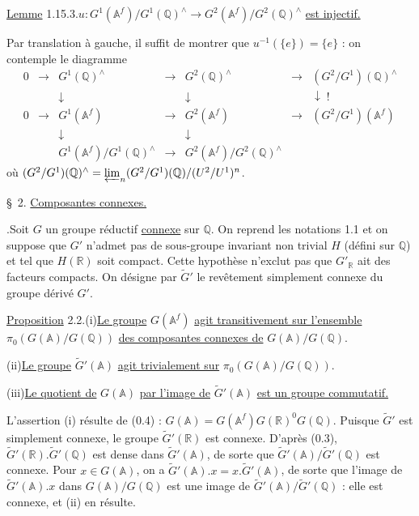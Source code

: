 \documentclass[10pt]{article}
\newcommand{\A}{\mathbb A}
\newcommand{\Af}{\mathbb A^f}
\newcommand{\Q}{\mathbb Q}
\newcommand{\R}{\mathbb R}
\newcommand{\limproj}{\varprojlim}
\begin{document}
\noindent\uline{Lemme} 1.15.3.\quad $u:G^1(\Af)/G^1(\Q)^\wedge\longrightarrow G^2(\Af)/G^2(\Q)^\wedge$ \uline{est injectif.}

Par translation à gauche, il suffit de montrer que $u^{-1}(\{e\})=\{e\}$ : on contemple le diagramme
\[
\begin{array}{ccccccccc}
0&\longrightarrow&G^1(\Q)^\wedge&\longrightarrow&G^2(\Q)^\wedge&\longrightarrow&(G^2/G^1)(\Q)^\wedge\\
&&\downarrow&&\downarrow&&\downarrow\;{\scriptstyle !}\\
0&\longrightarrow&G^1(\Af)&\longrightarrow&G^2(\Af)&\longrightarrow&(G^2/G^1)(\Af)\\
&&\downarrow&&\downarrow&&\\
&&G^1(\Af)/G^1(\Q)^\wedge&\longrightarrow&G^2(\Af)/G^2(\Q)^\wedge&&
\end{array}
\]
où $(G^2/G^1)(\Q)^\wedge=\limproj_n (G^2/G^1)(\Q)/(U^2/U^1)^n$.

\noindent \S\ 2. \uline{Composantes connexes.}\par\vspace{0.9em}

.\quad Soit $G$ un groupe réductif \uline{connexe} sur $\Q$. On reprend les notations 1.1 et on suppose que $G'$ n'admet pas de sous-groupe invariant non trivial $H$ (défini sur $\Q$) et tel que $H(\R)$ soit compact. Cette hypothèse n'exclut pas que $G'_\R$ ait des
facteurs compacts. On désigne par $\widetilde G'$ le revêtement simplement connexe du groupe dérivé $G'$.

\noindent\uline{Proposition} 2.2.\quad (i)\quad \uline{Le groupe} $G(\Af)$ \uline{agit transitivement sur l'ensemble} $\pi_0(G(\A)/G(\Q))$ \uline{des composantes connexes de} $G(\A)/G(\Q)$.
\par\smallskip\noindent\hspace{2.8em}(ii)\quad \uline{Le groupe} $\widetilde G'(\A)$ \uline{agit trivialement sur} $\pi_0(G(\A)/G(\Q))$.
\par\smallskip\noindent\hspace{2.8em}(iii)\quad \uline{Le quotient de} $G(\A)$ \uline{par l'image de} $\widetilde G'(\A)$ \uline{est un groupe commutatif.}

L'assertion (i) résulte de (0.4) : $G(\A)=G(\Af)G(\R)^0G(\Q)$.
Puisque $\widetilde G'$ est simplement connexe, le groupe $\widetilde G'(\R)$ est connexe. D'après (0.3), $\widetilde G'(\R).\widetilde G'(\Q)$ est dense dans $\widetilde G'(\A)$, de sorte que $\widetilde G'(\A)/\widetilde G'(\Q)$ est connexe. Pour $x\in G(\A)$, on a $\widetilde G'(\A).x=x.\widetilde G'(\A)$, de sorte que l'image de $\widetilde G'(\A).x$ dans $G(\A)/G(\Q)$ est une image de $\widetilde G'(\A)/\widetilde G'(\Q)$ : elle est connexe, et (ii) en résulte.
\end{document}
